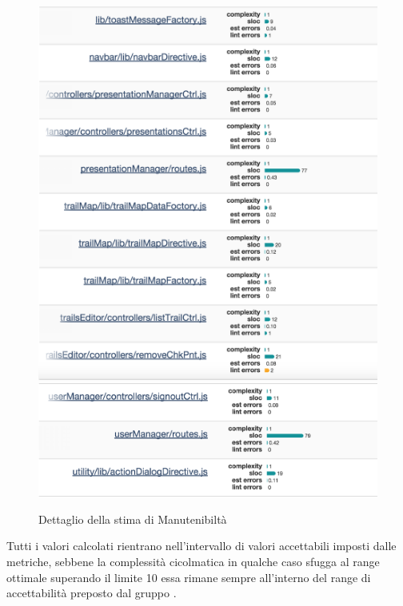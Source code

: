 \pagebreak

\begin{figure}[h!]
	\centering
	\includegraphics[scale=.43]{img/lint5.png}
	\centering
	\includegraphics[scale=.43]{img/lint6.png}
	\caption{Dettaglio della stima di Manutenibiltà}
\end{figure} 

Tutti i valori calcolati rientrano nell'intervallo di valori accettabili imposti dalle metriche, sebbene la complessità cicolmatica in qualche caso sfugga al range ottimale superando il limite 10 essa rimane sempre all'interno del range di accettabilità preposto dal gruppo \gruppo.